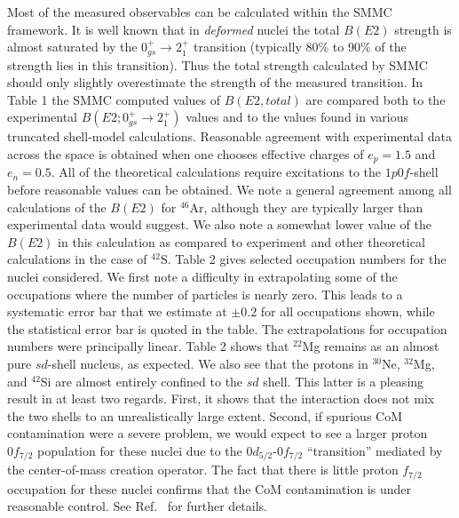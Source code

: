\documentclass[twoside,12pt]{article}
\begin{document}
Most of the measured observables can be calculated within the SMMC
framework.  It is well known that in {\it deformed} nuclei the total
$B(E2)$ strength is almost saturated by the $0^+_{gs} \rightarrow
2_1^+$ transition (typically 80\% to 90\% of the strength lies in this
transition).
Thus the total strength calculated by SMMC should only
slightly overestimate the strength of the measured transition.  In
Table 1 the SMMC computed values of $B(E2, total)$ are
compared both to the experimental $B(E2; 0^+_{gs} \rightarrow 2^+_1)$
values and to the values found in various truncated shell-model
calculations.  Reasonable agreement with experimental data across the
space is obtained when one chooses effective charges of $e_p=1.5$ and
$e_n=0.5$.
All of the theoretical
calculations require excitations to the $1p0f$-shell before reasonable
values can be obtained.  We note a general agreement among all
calculations of the $B(E2)$ for $^{46}$Ar, although they are typically
larger than experimental data would suggest. We also note a somewhat
lower value of the $B(E2)$ in this calculation as compared to
experiment and other theoretical calculations in the case of $^{42}$S.
Table 2 gives selected occupation numbers for the nuclei
considered.  We first note a difficulty in extrapolating some of the
occupations where the number of particles is nearly zero.  This leads
to a systematic error bar that we estimate at $\pm 0.2$ for all
occupations shown, while the statistical error bar is quoted in the
table. The extrapolations for occupation numbers were principally
linear. Table 2 shows that $^{22}$Mg remains as an almost
pure $sd$-shell nucleus, as expected.  We also see that the protons in
$^{30}$Ne, $^{32}$Mg, and $^{42}$Si are almost entirely confined to the
$sd$ shell.  This latter is a pleasing result in at least two regards.
First, it shows that the interaction does not mix the two shells to an
unrealistically large extent.  Second, if spurious CoM  contamination
were a severe problem, we would expect to see a larger proton
$0f_{7/2}$ population for these nuclei due to the $0d_{5/2}$-$0f_{7/2}$
``transition'' mediated by the center-of-mass creation operator.  The fact that
there is little proton $f_{7/2}$ occupation for these nuclei confirms
that the CoM contamination is under reasonable control.
See Ref.\ \cite{drhklz99} for further details.
\end{document}
